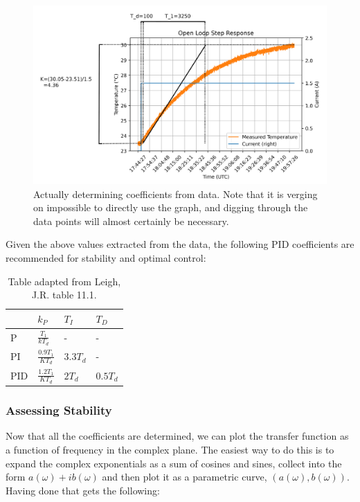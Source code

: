 \documentclass[11pt, letterpaper]{article}
\begin{document}
\begin{figure}[H]
    \centering
    \includegraphics[width=18cm]{realOpenLoopStep.png}
    \caption{ Actually determining coefficients from data. Note that it is verging on impossible to directly use the graph, and digging through the data points will almost certainly be necessary. }
    \label{fig:realOpenLoopStep}
\end{figure}

Given the above values extracted from the data, the following PID coefficients are recommended for stability and optimal control:

\begin{table}[H]
\centering
\begin{tabular}{llll}
     & $k_P$ & $T_I$ & $T_D$  \\[0.3cm] \hline
 P   & $\frac{T_1}{kT_d}$  & -  & - \\[0.3cm]
 PI  & $\frac{0.9 T_1}{KT_d}$  & $3.3T_d$ &  -\\[0.3cm]
 PID & $\frac{1.2 T_1}{KT_d}$  & $2T_d$  & $0.5T_d$
\end{tabular}
\caption{Table adapted from Leigh, J.R. table 11.1.}
\end{table}

\subsubsection{Assessing Stability}
Now that all the coefficients are determined, we can plot the transfer function as a function of frequency in the complex plane. The easiest way to do this is to expand the complex exponentials as a sum of cosines and sines, collect into the form $a(\omega)+ib(\omega)$ and then plot it as a parametric curve, $(a(\omega),b(\omega))$. Having done that gets the following:
\end{document}
